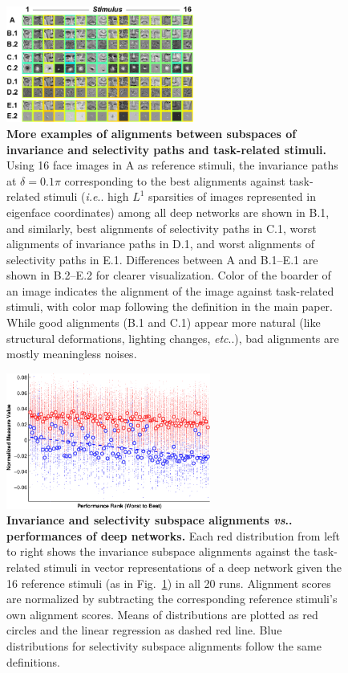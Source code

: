 \documentclass{article} %
\makeatletter
\DeclareRobustCommand\onedot{\futurelet\@let@token\@onedot}
\def\@onedot{\ifx\@let@token.\else.\null\fi\xspace}
\def\ie{\emph{i.e}\onedot} \def\Ie{\emph{I.e}\onedot}
\def\etc{\emph{etc}\onedot} \def\vs{\emph{vs}\onedot}
\makeatother
\begin{document}
\begin{figure}[H]
\centering \includegraphics[width=0.55\textwidth]{Figs_supp/pic3.pdf} 
\caption{{\bf More examples of alignments between subspaces of invariance and selectivity paths and task-related stimuli.}
Using 16 face images in A as reference stimuli, the invariance paths at $\delta = 0.1\pi$ corresponding to the best alignments against task-related stimuli (\ie high $L^1$ sparsities of images represented in eigenface coordinates) among all deep networks are shown in B.1, and similarly, best alignments of selectivity paths in C.1, worst alignments of invariance paths in D.1, and worst alignments of selectivity paths in E.1.
Differences between A and B.1--E.1 are shown in B.2--E.2 for clearer visualization.
Color of the boarder of an image indicates the alignment of the image against task-related stimuli, with color map following the definition in the main paper.
While good alignments (B.1 and C.1) appear more natural (like structural deformations, lighting changes, \etc), bad alignments are mostly meaningless noises.
} %
\label{refstim2}
\end{figure}

\begin{figure}[H]
\centering \includegraphics[width=0.60\textwidth]{Figs_supp/e_fig5d-crop.pdf}
\caption{ 
{\bf Invariance and selectivity subspace alignments \vs performances of deep networks.} Each red distribution from left to right shows the invariance subspace alignments against the task-related stimuli in vector representations of a deep network given the 16 reference stimuli (as in Fig.~\ref{refstim2}) in all 20 runs. Alignment scores are normalized by subtracting the corresponding reference stimuli's own alignment scores. Means of distributions are plotted as red circles and the linear regression as dashed red line. Blue distributions for selectivity subspace alignments follow the same definitions.
}
\end{figure}
\end{document}
